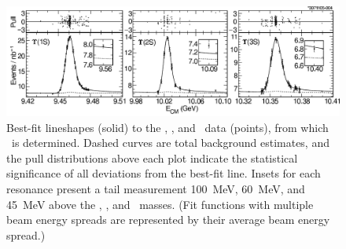 \documentclass{cornell}
\begin{document}
\begin{figure}
  \begin{center}
    \includegraphics[width=\linewidth]{plots/fitresults}
  \end{center}
  \caption[Best-fit lineshapes for \us, \uss, and
  \usss]{\label{fitresults} Best-fit lineshapes (solid) to the \us,
  \uss, and \usss\ data (points), from which \geehadtot\ is
  determined.  Dashed curves are total background estimates, and the
  pull distributions above each plot indicate the statistical
  significance of all deviations from the best-fit line.  Insets for
  each resonance present a tail measurement 100~MeV, 60~MeV, and
  45~MeV above the \us, \uss, and \usss\ masses.  (Fit functions with
  multiple beam energy spreads are represented by their average beam
  energy spread.)}
\end{figure}
\end{document}
